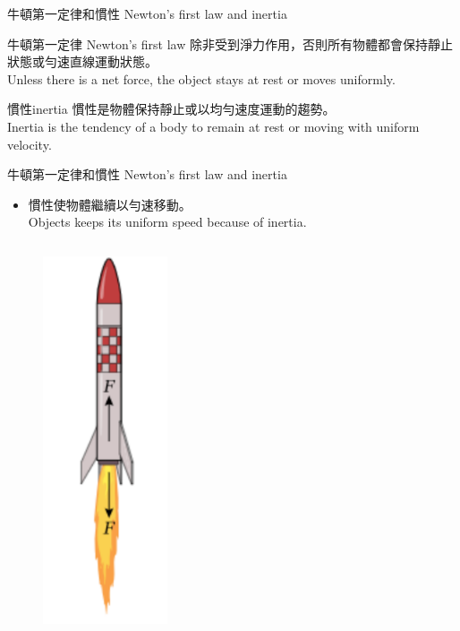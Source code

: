 \documentclass[beamer=true]{standalone}
\begin{document}
\begin{frame}{牛頓第一定律和慣性 Newton's first law and inertia}
    \begin{alertblock}
        {牛頓第一定律 Newton's first law}
        除非受到淨力作用，否則所有物體都會保持靜止狀態或勻速直線運動狀態。 \\Unless there is a net force, the object stays at rest or moves uniformly.
    \end{alertblock}
    \begin{exampleblock}
        {慣性inertia}
        慣性是物體保持靜止或以均勻速度運動的趨勢。\\Inertia is the tendency of a body to remain at rest or moving with uniform velocity.
    \end{exampleblock}
\end{frame}
\begin{frame}{牛頓第一定律和慣性 Newton's first law and inertia}
    \begin{itemize}
        \item 慣性使物體繼續以勻速移動。\\Objects keeps its uniform speed because of inertia.\bigskip\bigskip
    \end{itemize}
    \begin{columns}
        \begin{figure}[h!]
            \centering
            \includegraphics[width=0.4\textwidth]{assets/c32f5f7b.png}

\end{figure}
\end{columns}
\end{frame}
\end{document}
